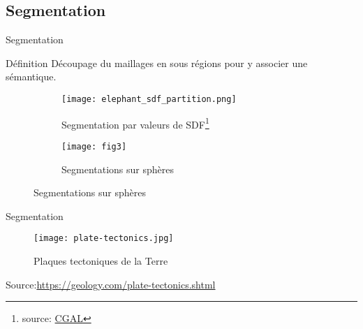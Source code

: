 \documentclass{beamer}
\begin{document}
\subsection{Segmentation}
\begin{frame}{Segmentation}

\begin{block}{Définition}
Découpage du maillages en sous régions pour y associer une sémantique.
\end{block}


\begin{figure}[H]
        \begin{subfigure}[b]{0.5\textwidth}
                \centering
                \texttt{[image: elephant\_sdf\_partition.png]}
                \caption{Segmentation par valeurs de SDF\footnote{source: \href{https://doc.cgal.org/latest/Surface_mesh_segmentation/index.html}{CGAL}}}
        \end{subfigure}%
        \begin{subfigure}[b]{0.5\textwidth}
                \centering
                \texttt{[image: fig3]}
                \caption{Segmentations sur sphères}
        \end{subfigure}%
\end{figure}

\end{frame}

\begin{frame}{Segmentation}
\begin{figure}
 \centering
 \texttt{[image: plate-tectonics.jpg]}
 \caption{Plaques tectoniques de la Terre}
\end{figure}
\tiny{Source:\url{https://geology.com/plate-tectonics.shtml}}
\end{frame}
\end{document}
